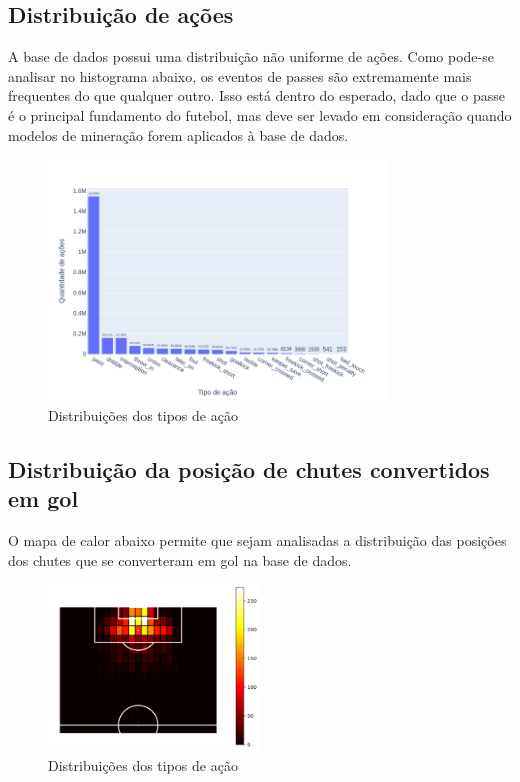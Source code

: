 \documentclass{article}
\begin{document}
\subsection{Distribuição de ações}

A base de dados possui uma distribuição não uniforme de ações. Como pode-se
analisar no histograma abaixo, os eventos de passes são extremamente mais
frequentes do que qualquer outro. Isso está dentro do esperado, dado que o
passe é o principal fundamento do futebol, mas deve ser levado em consideração
quando modelos de mineração forem aplicados à base de dados.

\begin{figure}[H]
	\centering
	\includegraphics[width=0.8\textwidth]{images/action_distribution.png}
	\caption{Distribuições dos tipos de ação}
	\label{fig:action_distribution}
\end{figure}

\subsection{Distribuição da posição de chutes convertidos em gol}

O mapa de calor abaixo permite que sejam analisadas a distribuição das posições
dos chutes que se converteram em gol
na base de dados.

\begin{figure}[H]
	\centering
	\includegraphics[width=0.5\textwidth]{images/goal_position_heatmap.png}
	\caption{Distribuições dos tipos de ação}
	\label{fig:heatmap_goals}
\end{figure}
\end{document}

